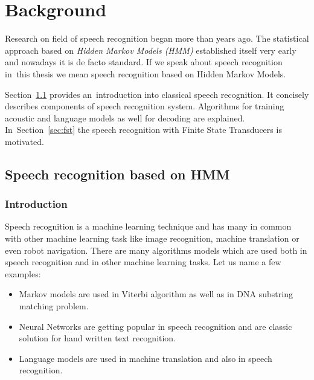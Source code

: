 \chapter{Background}
\label{cha:background}

% 
% 

Research on field of speech recognition began more than  years ago. The statistical approach based on {\it Hidden Markov Models (HMM)} established itself very early and nowadays it is de facto standard. If we speak about speech recognition in~this thesis we mean speech recognition based on Hidden Markov Models. 

Section~\ref{sec:general_introduction} provides an~introduction into classical speech recognition. It concisely describes components of speech recognition system. Algorithms for training acoustic and language models as well for decoding are explained. In~Section~\ref{sec:fst} the speech recognition with Finite State Transducers is motivated.

\section{Speech recognition based on HMM} 
\label{sec:general_introduction}
\subsection{Introduction}
\label{sub:intro_ml}

Speech recognition is a machine learning technique and has many in common with other machine learning task like image recognition, machine translation or even robot navigation. There are many algorithms models which are used both in speech recognition and in other machine learning tasks.
Let us name a few examples:
\begin{itemize}
    \item Markov models are used in Viterbi algorithm as well as in DNA substring matching problem.
    \item Neural Networks are getting popular in speech recognition and are classic solution for hand written text recognition.
    \item Language models are used in machine translation and also in speech recognition. 
\end{itemize}

